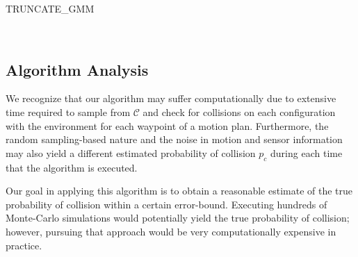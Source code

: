 \documentclass[journal]{IEEEtran}
\begin{document}
\begin{algorithm}
  \caption{TRUNCATE\_GMM}
  \begin{algorithmic}[1]
     \label{trunc_alg:sample}
     \label{trunc_alg:collision_free}
    \STATE{$[F_{1},...,F_{N_G}]\gets [0,...,0]$} \label{trunc_alg:nocoll_counts}
     \label{trunc_alg:total_collcount}
     \label{trunc_alg:mainloop_begin}
    \ELSE
     \label{trunc_alg:chiupdate}
    \ENDIF
    \ENDFOR
    \ENDFOR \label{trunc_alg:mainloop_end}

     \label{trunc_alg:mean_covbegin}
     \label{trunc_alg:weightupdate}
    \ENDFOR \label{trunc_alg:mean_covend}

    \\%
  \end{algorithmic}
\label{trunc_gmm}
\end{algorithm}

\subsection{Algorithm Analysis}
We recognize that our algorithm may suffer computationally due to extensive time required to sample from $\mathcal{C}$ and check for collisions on each configuration with the environment for each waypoint of a motion plan. Furthermore, the random sampling-based nature and the noise in motion and sensor information may also yield a different estimated probability of collision $p_c$ during each time that the algorithm is executed.

Our goal in applying this algorithm is to obtain a reasonable estimate of the true probability of collision within a certain error-bound. Executing hundreds of Monte-Carlo simulations would potentially yield the true probability of collision; however, pursuing that approach would be very computationally expensive in practice.
\end{document}
